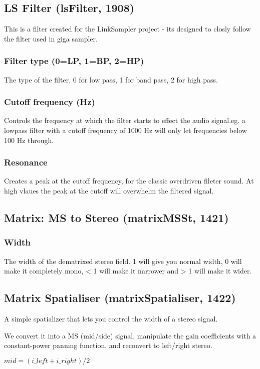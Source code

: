 \documentclass[11pt]{article}
\begin{document}
                \subsection{LS Filter (lsFilter, 1908)\label{lsFilter}\label{id1908}}
This is a filter created for the LinkSampler project - its designed to closly follow the filter used in giga sampler.\subsubsection*{Filter type (0=LP, 1=BP, 2=HP)}
The type of the filter, 0 for low pass, 1 for band pass, 2 for high pass.\subsubsection*{Cutoff frequency (Hz)}
Controls the frequency at which the filter starts to effect the audio signal.eg. a lowpass filter with a cutoff frequency of 1000 Hz will only let frequencies below 100 Hz through.\subsubsection*{Resonance}
Creates a peak at the cutoff frequency, for the classic overdriven fileter sound. At high vlaues the peak at the cutoff will overwhelm the filtered signal.\subsection{Matrix: MS to Stereo (matrixMSSt, 1421)\label{matrixMSSt}\label{id1421}}
\subsubsection*{Width}
The width of the dematrixed stereo field. 1 will give you normal width, 0 will make it completely mono, < 1 will make it narrower and > 1 will make it wider.\subsection{Matrix Spatialiser (matrixSpatialiser, 1422)\label{matrixSpatialiser}\label{id1422}}

      A simple spatializer that lets you control the width of a stereo signal.

      We convert it into a MS (mid/side) signal, manipulate the gain coefficients
      with a constant-power panning function, and reconvert to left/right stereo.

      $mid = (i\_left + i\_right) / 2$
\end{document}
